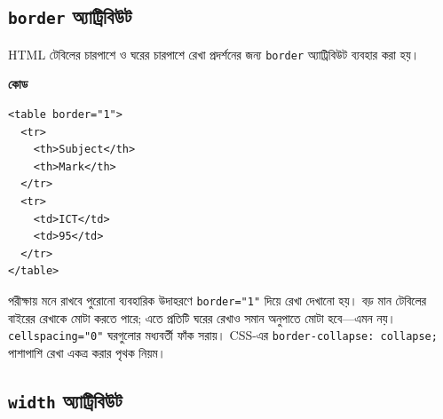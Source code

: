 

\subsection{\texttt{border} অ্যাট্রিবিউট}

\begin{definitionbox}{}
HTML টেবিলের চারপাশে ও ঘরের চারপাশে রেখা প্রদর্শনের জন্য \texttt{border} অ্যাট্রিবিউট ব্যবহার করা হয়।
\end{definitionbox}

\par\noindent
\begin{minipage}[t]{.54\linewidth}\vspace{0pt}\small
\textbf{\color{chFourTeal}কোড}\par
\begin{verbatim}
<table border="1">
  <tr>
    <th>Subject</th>
    <th>Mark</th>
  </tr>
  <tr>
    <td>ICT</td>
    <td>95</td>
  </tr>
</table>
\end{verbatim}
\par\smallskip
\end{minipage}\hfill
\begin{minipage}[t]{.42\linewidth}\vspace{0pt}\small
\begin{boardbox}{পরীক্ষায় মনে রাখবে}
পুরোনো ব্যবহারিক উদাহরণে \texttt{border="1"} দিয়ে রেখা দেখানো হয়। বড় মান টেবিলের বাইরের রেখাকে মোটা করতে পারে; এতে প্রতিটি ঘরের রেখাও সমান অনুপাতে মোটা হবে—এমন নয়। \texttt{cellspacing="0"} ঘরগুলোর মধ্যবর্তী ফাঁক সরায়। CSS-এর \texttt{border-collapse: collapse;} পাশাপাশি রেখা একত্র করার পৃথক নিয়ম।
\end{boardbox}
\end{minipage}\par


\subsection{\texttt{width} অ্যাট্রিবিউট}

